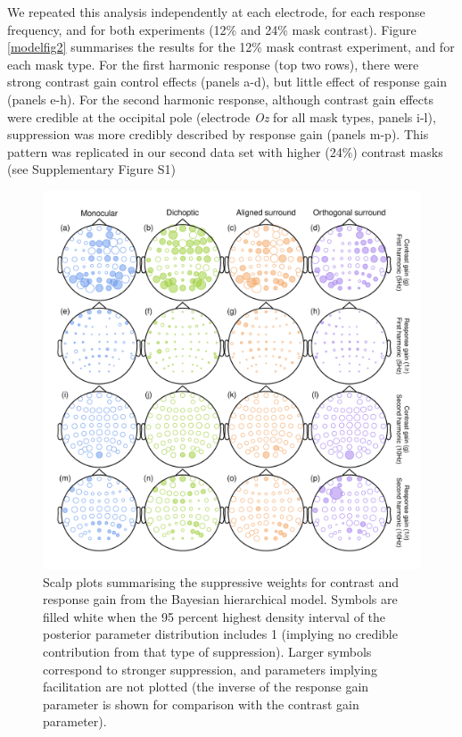 \documentclass[]{article}
\begin{document}
We repeated this analysis independently at each electrode, for each response frequency, and for both experiments (12\% and 24\% mask contrast). Figure \ref{modelfig2} summarises the results for the 12\% mask contrast experiment, and for each mask type. For the first harmonic response (top two rows), there were strong contrast gain control effects (panels a-d), but little effect of response gain (panels e-h). For the second harmonic response, although contrast gain effects were credible at the occipital pole (electrode \emph{Oz} for all mask types, panels i-l), suppression was more credibly described by response gain (panels m-p). This pattern was replicated in our second data set with higher (24\%) contrast masks (see Supplementary Figure S1)

\begin{figure}

{\centering \includegraphics{figures/modelfig2} 

}

\caption{Scalp plots summarising the suppressive weights for contrast and response gain from the Bayesian hierarchical model. Symbols are filled white when the 95 percent highest density interval of the posterior parameter distribution includes 1 (implying no credible contribution from that type of suppression). Larger symbols correspond to stronger suppression, and parameters implying facilitation are not plotted (the inverse of the response gain parameter is shown for comparison with the contrast gain parameter).}\label{fig:modelfig2}
\end{figure}
\end{document}

